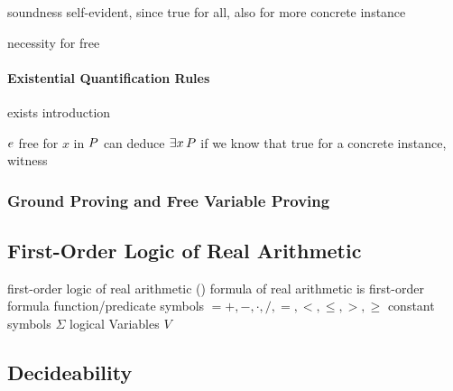                     soundness self-evident, since true for all, also for more concrete instance

                    \begin{example}
                        necessity for free

                    \end{example}

                \paragraph{Existential Quantification Rules}
                    exists introduction

                    \begin{calculus}
                    \end{calculus}

                    $e$ free for $x$ in $P$
                    can deduce $\exists x{\,} P$ if we know that true for a concrete instance, witness

            \subsubsection{Ground Proving and Free Variable Proving}
                \label{sec:ground-proving-free-variable-proving}



        \subsection{First-Order Logic of Real Arithmetic}
            \label{sec:FOL-R}

            first-order logic of real arithmetic (\FOLR)
            formula of real arithmetic
            is first-order formula
            function/predicate symbols $ = {+,-,\cdot,/,=,<,\leq,>,\geq}$
            constant symbols $\Sigma$
            logical Variables $V$

        \subsection{Decideability}
            \label{sec:decideability}

